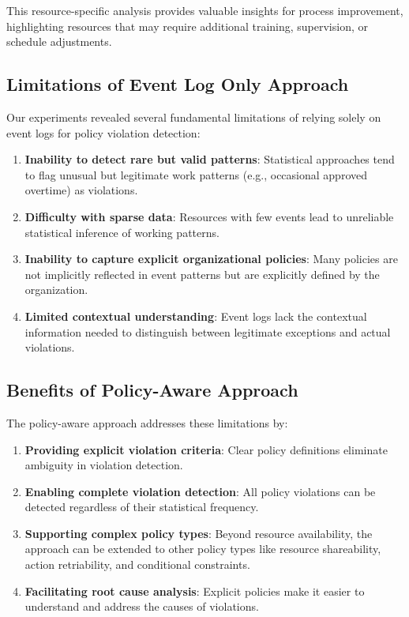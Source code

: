 This resource-specific analysis provides valuable insights for process improvement, highlighting resources that may require additional training, supervision, or schedule adjustments.

\subsection{Limitations of Event Log Only Approach}

Our experiments revealed several fundamental limitations of relying solely on event logs for policy violation detection:

\begin{enumerate}
    \item \textbf{Inability to detect rare but valid patterns}: Statistical approaches tend to flag unusual but legitimate work patterns (e.g., occasional approved overtime) as violations.
    
    \item \textbf{Difficulty with sparse data}: Resources with few events lead to unreliable statistical inference of working patterns.
    
    \item \textbf{Inability to capture explicit organizational policies}: Many policies are not implicitly reflected in event patterns but are explicitly defined by the organization.
    
    \item \textbf{Limited contextual understanding}: Event logs lack the contextual information needed to distinguish between legitimate exceptions and actual violations.
\end{enumerate}

\subsection{Benefits of Policy-Aware Approach}

The policy-aware approach addresses these limitations by:

\begin{enumerate}
    \item \textbf{Providing explicit violation criteria}: Clear policy definitions eliminate ambiguity in violation detection.
    
    \item \textbf{Enabling complete violation detection}: All policy violations can be detected regardless of their statistical frequency.
    
    \item \textbf{Supporting complex policy types}: Beyond resource availability, the approach can be extended to other policy types like resource shareability, action retriability, and conditional constraints.
    
    \item \textbf{Facilitating root cause analysis}: Explicit policies make it easier to understand and address the causes of violations.
\end{enumerate}

